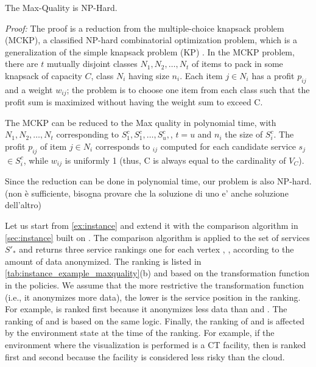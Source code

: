 \begin{theorem}\label{theorem:NP}
  The Max-Quality \problem is NP-Hard.
\end{theorem}
\emph{Proof: }
The proof is a reduction from the multiple-choice knapsack problem (MCKP), a classified NP-hard combinatorial optimization problem, which is a generalization of the simple knapsack problem (KP) \cite{}. In the MCKP problem, there are $t$ mutually disjoint classes $N_1,N_2,\ldots,N_t$ of items to pack in some knapsack of capacity $C$, class $N_i$ having size $n_i$. Each item $j$$\in$$N_i$ has a profit $p_{ij}$ and a weight $w_{ij}$; the problem is to choose one item from each class such that the profit sum is maximized without having the weight sum to exceed C.

The MCKP can be reduced to the Max quality \problem in polynomial time, with $N_1,N_2,\ldots,N_t$ corresponding to $S^c_{1}, S^c_{1}, \ldots, S^c_{u},$, $t$$=$$u$ and $n_i$ the size of $S^c_{i}$. The profit $p_{ij}$ of item $j$$\in$$N_i$ corresponds to \textit{\q}$_{ij}$ computed for each candidate service $s_j$$\in$$S^c_{i}$, while $w_{ij}$ is uniformly 1 (thus, C is always equal to the cardinality of $V_C$).

Since the reduction can be done in polynomial time, our problem is also NP-hard. (non è sufficiente, bisogna provare che la soluzione di uno e' anche soluzione dell'altro)


\begin{example}
  Let us start from \cref{ex:instance} and extend it with the comparison algorithm in \cref{sec:instance} built on \quality. The comparison algorithm is applied to the set of services $S'_*$ and returns three service rankings one for each vertex , ,  according to the amount of data anonymized.
  The ranking is listed in \cref{tab:instance_example_maxquality}(b) and based on the transformation function in the policies. We assume that the more restrictive the transformation function (i.e., it anonymizes more data), the lower is the service position in the ranking.
  For example,  is ranked first because it anonymizes less data than  and .
  The ranking of  and  is based on the same logic.
  Finally, the ranking of  and  is affected by the environment state at the time of the ranking.   For example, if the environment where the visualization is performed is a CT facility, then  is ranked first and  second because the facility is considered less risky than the cloud.
\end{example}

